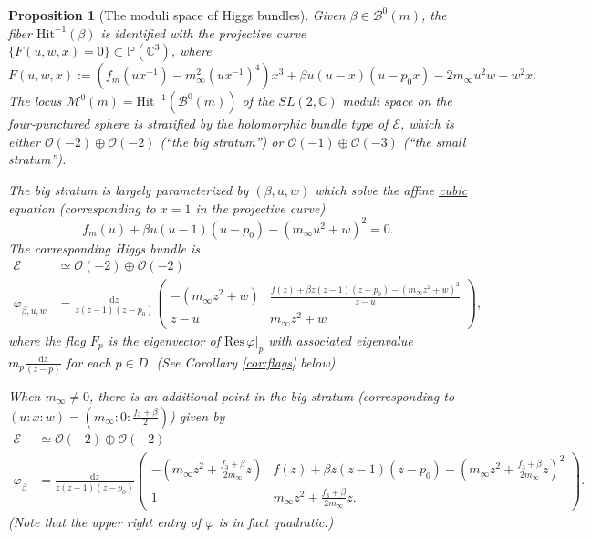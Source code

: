 \documentclass[12pt,letterpaper,reqno]{amsart}
\def\mathbf#1{#1}%
\newtheorem{prop}[thm]{Proposition}
\theoremstyle{remark}
\theoremstyle{definition}
\numberwithin{thm}{section}
\numberwithin{equation}{section}
\numberwithin{figure}{section}
\newcommand{\cB}{\ensuremath{\mathcal B}}
\newcommand{\cM}{\ensuremath{\mathcal M}}
\newcommand{\cO}{\ensuremath{\mathcal O}}
\newcommand{\C}{\ensuremath{\mathbb C}}
\newcommand{\cE}{{\mathcal E}}
\newcommand{\de}{\mathrm{d}}
\begin{document}
\begin{prop}[The moduli space of Higgs bundles]\label{prop:higgsbundles}
Given $\beta \in \cB^0(\mathbf{m})$, the fiber  $\mathrm{Hit}^{-1}(\beta)$ is identified with the projective curve $\{F(u,w,x) = 0\} \subset \mathbb P(\C^3)$, where
\begin{equation}\label{eq:projective}
F(u, w, x):=(f_{\mathbf{m}}(ux^{-1})-m_\infty^2(ux^{-1})^4)x^3  +\beta u(u-x)(u-p_0 x) - 2 m_\infty u^2 w - w^2 x.
\end{equation}
The locus $\cM^0(\mathbf{m}) = \mathrm{Hit}^{-1}(\mathcal{B}^0(\mathbf{m}))$ of the $SL(2,\C)$ moduli space on the four-punctured sphere is stratified by the holomorphic bundle type of $\cE$,
which is either $\cO(-2) \oplus \cO(-2)$ (``the big stratum'') or $\cO(-1) \oplus \cO(-3)$ (``the small stratum''). 

The big stratum is largely parameterized by $(\beta, u, w)$ which solve the affine \underline{cubic} equation (corresponding to $x=1$ in the 
projective curve) 
\begin{equation}\label{eq:cubic}
f_{\mathbf{m}}(u) + \beta u (u-1)(u-p_0) - (m_\infty u^2 + w)^2=0.
\end{equation} 
 The corresponding Higgs bundle is
 \begin{align}\label{eq:bigstrata}
 \cE &\simeq \cO(-2) \oplus \cO(-2)  \\ \nonumber
 \varphi_{\beta, u, w} &= \frac{\de z}{z(z-1)(z-p_0)}\begin{pmatrix}  -(m_\infty z^2 + w) & \frac{f(z) + \beta z (z-1)(z-p_0) - (m_\infty z^2 + w)^2}{z-u} \\  z-u & m_\infty z^2 + w \end{pmatrix},
\end{align}
where the flag $F_p$ is the eigenvector of $\mathrm{Res}\, \varphi|_p$ with associated eigenvalue $m_p \frac{\de z}{(z-p)}$ for each $p \in D$. (See Corollary \ref{cor:flags} below).

When $m_\infty \neq 0$, there is an additional point in the big stratum (corresponding to $(u:x:w)=(m_\infty: 0: \frac{f_3+\beta}{2})$) given by 
\begin{align} \label{eq:extrapoint}
  \cE &\simeq \cO(-2) \oplus \cO(-2)  \\ \nonumber
 \varphi_\beta &=  \frac{\de z}{z(z-1)(z-p_0)}\begin{pmatrix} -(m_\infty z^2 +
            \frac{f_3 + \beta}{2 m_\infty} z) & f(z) + \beta z(z-1)(z-p_0) 
            -\left(m_\infty z^2 +
            \frac{f_3 + \beta}{2 m_\infty} z\right)^2 \\ 1 & m_\infty z^2 +
            \frac{f_3 + \beta}{2 m_\infty} z.
           \end{pmatrix}.
\end{align}
(Note that the upper right entry of $\varphi$ is in fact quadratic.) 


\end{prop}
\end{document}
